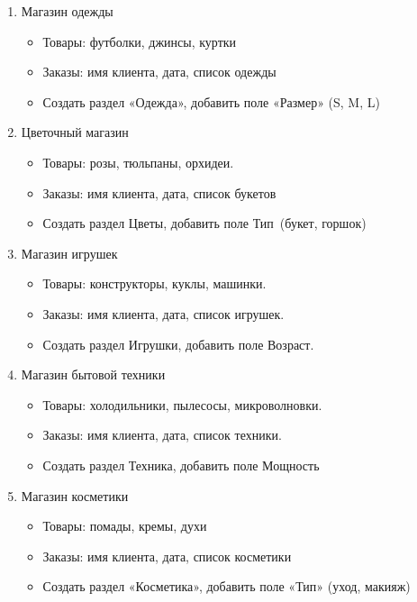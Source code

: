 \documentclass[12pt]{article}
\numberwithin{listing}{section}
\numberwithin{figure}{section}
\begin{document}
\begin{enumerate}
\item Магазин одежды
\begin{itemize}
	\item Товары: футболки, джинсы, куртки
	\item Заказы: имя клиента, дата, список одежды
	\item Создать раздел «Одежда», добавить поле «Размер» (S, M, L)
\end{itemize}

\item Цветочный магазин
\begin{itemize}
	\item Товары: розы, тюльпаны, орхидеи.
	\item Заказы: имя клиента, дата, список букетов
	\item Создать раздел \guillemotleft Цветы\guillemotright , добавить поле \guillemotleft Тип\guillemotright \ (букет, горшок)
\end{itemize}

\newpage

\item Магазин игрушек
\begin{itemize}
	\item Товары: конструкторы, куклы, машинки.
	\item Заказы: имя клиента, дата, список игрушек.
	\item Создать раздел \guillemotleft Игрушки\guillemotright, добавить поле \guillemotleft Возраст\guillemotright.
\end{itemize}

\item Магазин бытовой техники
\begin{itemize}
	\item Товары: холодильники, пылесосы, микроволновки.
	\item Заказы: имя клиента, дата, список техники.
	\item Создать раздел \guillemotleft Техника\guillemotright, добавить поле \guillemotleft Мощность\guillemotright
\end{itemize}

\item Магазин косметики
\begin{itemize}
	\item Товары: помады, кремы, духи
	\item Заказы: имя клиента, дата, список косметики
	\item Создать раздел «Косметика», добавить поле «Тип» (уход, макияж)
\end{itemize}


\end{enumerate}
\end{document}
